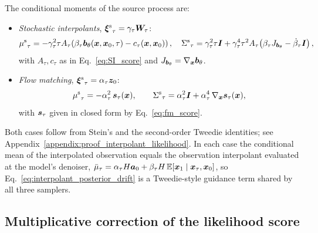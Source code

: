 \begin{lemma}\label{lem:source_moments}
The conditional moments of the source process are:
\begin{itemize}
    \item \emph{Stochastic interpolants}, ${\bm{\xi}^{\mathrm{s}}}_\tau = \gamma_\tau\boldsymbol{W}_\tau$:
    \begin{align}
        {\mu^{\mathrm{s}}}_\tau = -\gamma_\tau^2\tau A_\tau\!\left(\beta_\tau\bm{b}_\theta(\boldsymbol{x},\boldsymbol{x}_0,\tau) - c_\tau(\boldsymbol{x},\boldsymbol{x}_0)\right),
        \quad
        {\Sigma^{\mathrm{s}}}_\tau = \gamma_\tau^2\tau\bm{I} + \gamma_\tau^4\tau^2 A_\tau\!\left(\beta_\tau J_{\bm{b}_\theta} - \dot\beta_\tau\bm{I}\right),
    \end{align}
    with $A_\tau, c_\tau$ as in Eq.~\eqref{eq:SI_score} and $J_{\bm{b}_\theta}=\nabla_{\boldsymbol{x}}\bm{b}_\theta$.
    \item \emph{Flow matching}, ${\bm{\xi}^{\mathrm{s}}}_\tau = \alpha_\tau\bm{z}_0$:
    \begin{align}\label{eq:fm_source_moments}
        {\mu^{\mathrm{s}}}_\tau = -\alpha_\tau^2\,\bm{s}_\tau(\boldsymbol{x}),
        \qquad
        {\Sigma^{\mathrm{s}}}_\tau = \alpha_\tau^2\bm{I} + \alpha_\tau^4\,\nabla_{\boldsymbol{x}}\bm{s}_\tau(\boldsymbol{x}),
    \end{align}
    with $\bm{s}_\tau$ given in closed form by Eq.~\eqref{eq:fm_score}.
\end{itemize}
\end{lemma}
Both cases follow from Stein's and the second-order Tweedie identities; see Appendix~\ref{appendix:proof_interpolant_likelihood}. In each case the conditional mean of the interpolated observation equals the observation interpolant evaluated at the model's denoiser, $\bar\mu_\tau = \alpha_\tau H\bm a_0 + \beta_\tau H\,\mathbb{E}[\boldsymbol{x}_1\mid\boldsymbol{x}_\tau,\boldsymbol{x}_0]$, so Eq.~\eqref{eq:interpolant_posterior_drift} is a Tweedie-style guidance term shared by all three samplers.

\subsection{Multiplicative correction of the likelihood score}
\label{sec:multiplicative_correction}

